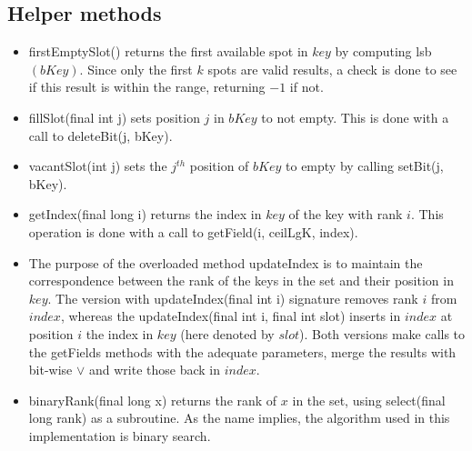 \subsection{Helper methods}
\begin{itemize}
    \item
    {\ttfamily firstEmptySlot()} returns the first available spot in $key$ by computing lsb$(bKey)$. Since only the first $k$ spots are valid results, a check is done to see if this result is within the range, returning $-1$ if not.
    
    \item
    {\ttfamily fillSlot(final int j)} sets position $j$ in $bKey$ to not empty. This is done with a call to {\ttfamily deleteBit(j, bKey)}.
    
    \item
    {\ttfamily vacantSlot(int j)} sets the $j^{th}$ position of $bKey$ to empty by calling {\ttfamily setBit(j, bKey)}.
    
    \item
    {\ttfamily getIndex(final long i)} returns the index in $key$ of the key with rank $i$. This operation is done with a call to {\ttfamily getField(i, ceilLgK, index)}.
    
    \item
    The purpose of the overloaded method {\ttfamily updateIndex} is to maintain the correspondence between the rank of the keys in the set and their position in $key$.
    The version with {\ttfamily updateIndex(final int i)} signature removes rank $i$ from $index$, whereas the {\ttfamily updateIndex(final int i, final int slot)} inserts in $index$ at position $i$ the index in $key$ (here denoted by $slot$). Both versions make calls to the {\ttfamily getFields} methods with the adequate parameters, merge the results with bit-wise $\vee$ and write those back in $index$.
    
    \item
    {\ttfamily binaryRank(final long x)} returns the rank of $x$ in the set, using {\ttfamily select(final long rank)} as a subroutine. As the name implies, the algorithm used in this implementation is binary search.
\end{itemize}

